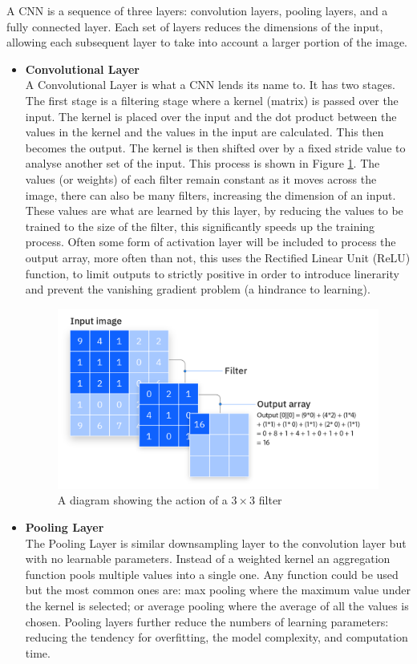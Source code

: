 A CNN is a sequence of three layers: convolution layers, pooling layers, and a fully connected layer\cite{ibmconvolutional}. Each set of layers reduces the dimensions of the input, allowing each subsequent layer to take into account a larger portion of the image.

\begin{itemize}
    \item \textbf{Convolutional Layer}\\
    A Convolutional Layer is what a CNN lends its name to. It has two stages. The first stage is a filtering stage where a kernel (matrix) is passed over the input. The kernel is placed over the input and the dot product between the values in the kernel and the values in the input are calculated. This then becomes the output. The kernel is then shifted over by a fixed stride value to analyse another set of the input. This process is shown in Figure \ref{fig:filter}. The values (or weights) of each filter remain constant as it moves across the image, there can also be many filters, increasing the dimension of an input. These values are what are learned by this layer, by reducing the values to be trained to the size of the filter, this significantly speeds up the training process. Often some form of activation layer will be included to process the output array, more often than not, this uses the Rectified Linear Unit (ReLU) function, to limit outputs to strictly positive in order to introduce linerarity and prevent the vanishing gradient problem (a hindrance to learning)\cite{ibmconvolutional}.
    \begin{figure}[h]
        \centering
        \includegraphics[width=0.5\linewidth]{dissertation//figures/cnn-filter.png}
        \caption{A diagram showing the action of a $3 \times 3$ filter\cite{ibmconvolutional}}
        \label{fig:filter}
    \end{figure}

    \item \textbf{Pooling Layer}\\
    The Pooling Layer is similar downsampling layer to the convolution layer but with no learnable parameters. Instead of a weighted kernel an aggregation function pools multiple values into a single one\cite{o2015introduction}. Any function could be used but the most common ones are: max pooling where the maximum value under the kernel is selected; or average pooling where the average of all the values is chosen. Pooling layers further reduce the numbers of learning parameters: reducing the tendency for overfitting, the model complexity, and computation time\cite{ibmconvolutional}.


\end{itemize}
